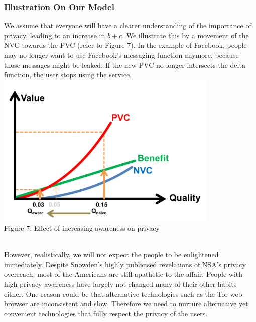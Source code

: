 \documentclass{icmmcm}
\begin{document}
\subsubsection{Illustration On Our Model}
We assume that everyone will have a clearer understanding of the importance of privacy, leading to an increase in $b+c$. We illustrate this by a movement of the NVC towards the PVC (refer to Figure 7). In the example of Facebook, people may no longer want to use Facebook’s messaging function anymore, because those messages might be leaked. If the new PVC no longer intersects the delta function, the user stops using the service.\\
\includegraphics[width=0.8\textwidth]{Picture5.png}
\\ \caption{Figure 7: Effect of increasing awareness on privacy} \\


However, realistically, we will not expect the people to be enlightened immediately. Despite Snowden's highly publicised revelations of NSA's privacy overreach, most of the Americans are still apathetic to the affair. People with high privacy awareness have largely not changed many of their other habits either. One reason could be that alternative technologies such as the Tor web browser are inconsistent and slow. Therefore we need to nurture alternative yet convenient technologies that fully respect the privacy of the users.
\end{document}
